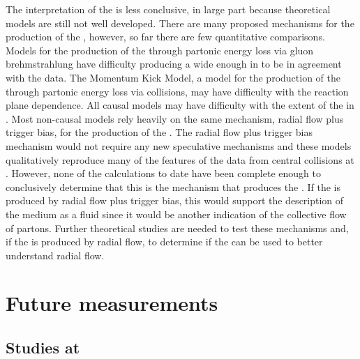 The interpretation of the \ridge is less conclusive, in large part because theoretical models are still not well developed.  There are many proposed mechanisms for the production of the \ridge, however, so far there are few quantitative comparisons.  Models for the production of the \ridge through partonic energy loss via gluon brehmstrahlung have difficulty producing a \ridge wide enough in \deta to be in agreement with the data.  The Momentum Kick Model, a model for the production of the \ridge through partonic energy loss via collisions, may have difficulty with the reaction plane dependence.  All causal models may have difficulty with the extent of the \ridge in \deta.  Most non-causal models rely heavily on the same mechanism, radial flow plus trigger bias, for the production of the \ridge.  The radial flow plus trigger bias mechanism would not require any new speculative mechanisms and these models qualitatively reproduce many of the features of the data from central \Au collisions at \sNNtwohundred.  However, none of the calculations to date have been complete enough to conclusively determine that this is the mechanism that produces the \ridge.  If the \ridge is produced by radial flow plus trigger bias, this would support the description of the medium as a fluid since it would be another indication of the collective flow of partons.  Further theoretical studies are needed to test these mechanisms and, if the \ridge is produced by radial flow, to determine if the \ridge can be used to better understand radial flow.

\section{Future measurements}

\subsection{Studies at \sNNtwohundred}

